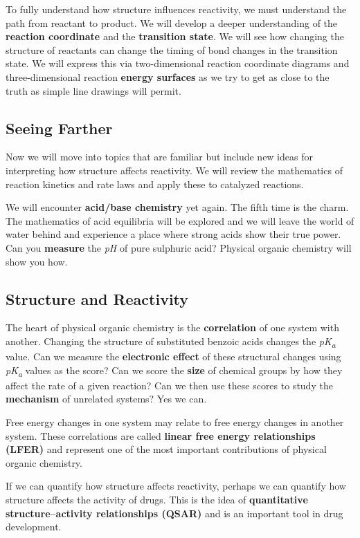 To fully understand how structure influences reactivity, we must understand the path from reactant to product. We will develop a deeper understanding of the \textbf{reaction coordinate} and the \textbf{transition state}. We will see how changing the structure of reactants can change the timing of bond changes in the transition state. We will express this via two-dimensional reaction coordinate diagrams and three-dimensional reaction \textbf{energy surfaces} as we try to get as close to the truth as simple line drawings will permit.

\subsection{Seeing Farther}

Now we will move into topics that are familiar but include new ideas for interpreting how structure affects reactivity. We will review the mathematics of reaction kinetics and rate laws and apply these to catalyzed reactions.

We will encounter \textbf{acid/base chemistry} yet again. The fifth time is the charm. The mathematics of acid equilibria will be explored and we will leave the world of water behind and experience a place where strong acids show their true power. Can you \textbf{measure} the \emph{pH} of pure sulphuric acid? Physical organic chemistry will show you how.

\subsection{Structure and Reactivity}

The heart of physical organic chemistry is the \textbf{correlation} of one system with another. Changing the structure of substituted benzoic acids changes the \emph{pK\textsubscript{a}} value. Can we measure the \textbf{electronic effect} of these structural changes using \emph{pK\textsubscript{a}} values as the score? Can we score the \textbf{size} of chemical groups by how they affect the rate of a given reaction? Can we then use these scores to study the \textbf{mechanism} of unrelated systems? Yes we can.

Free energy changes in one system may relate to free energy changes in another system. These correlations are called \textbf{linear free energy relationships (LFER)} and represent one of the most important contributions of physical organic chemistry.

If we can quantify how structure affects reactivity, perhaps we can quantify how structure affects the activity of drugs. This is the idea of \textbf{quantitative structure--activity relationships (QSAR)} and is an important tool in drug development.

